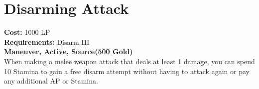 \section{Disarming Attack}\label{maneuver:disarmingAttack}
\textbf{Cost:} 1000 LP\\
\textbf{Requirements:} Disarm III\\
\textbf{Maneuver, Active, Source(500 Gold)}\\
When making a melee weapon attack that deals at least 1 damage, you can spend 10 Stamina to gain a free disarm attempt without having to attack again or pay any additional AP or Stamina.\\
